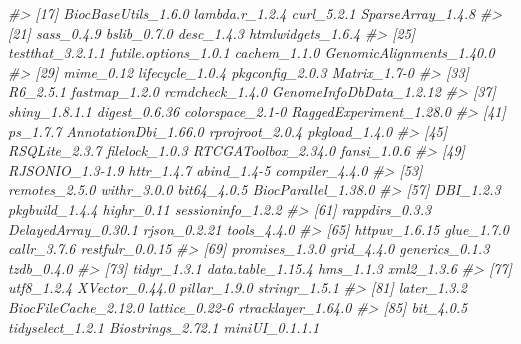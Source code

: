 \documentclass[
]{article}
\newenvironment{Shaded}{\begin{snugshade}}{\end{snugshade}}
\newcommand{\CommentTok}[1]{\textcolor[rgb]{0.56,0.35,0.01}{\textit{#1}}}
\begin{document}
\begin{Shaded}
\begin{Highlighting}[]
\CommentTok{\#\textgreater{}  [17] BiocBaseUtils\_1.6.0       lambda.r\_1.2.4            curl\_5.2.1                SparseArray\_1.4.8        }
\CommentTok{\#\textgreater{}  [21] sass\_0.4.9                bslib\_0.7.0               desc\_1.4.3                htmlwidgets\_1.6.4        }
\CommentTok{\#\textgreater{}  [25] testthat\_3.2.1.1          futile.options\_1.0.1      cachem\_1.1.0              GenomicAlignments\_1.40.0 }
\CommentTok{\#\textgreater{}  [29] mime\_0.12                 lifecycle\_1.0.4           pkgconfig\_2.0.3           Matrix\_1.7{-}0             }
\CommentTok{\#\textgreater{}  [33] R6\_2.5.1                  fastmap\_1.2.0             rcmdcheck\_1.4.0           GenomeInfoDbData\_1.2.12  }
\CommentTok{\#\textgreater{}  [37] shiny\_1.8.1.1             digest\_0.6.36             colorspace\_2.1{-}0          RaggedExperiment\_1.28.0  }
\CommentTok{\#\textgreater{}  [41] ps\_1.7.7                  AnnotationDbi\_1.66.0      rprojroot\_2.0.4           pkgload\_1.4.0            }
\CommentTok{\#\textgreater{}  [45] RSQLite\_2.3.7             filelock\_1.0.3            RTCGAToolbox\_2.34.0       fansi\_1.0.6              }
\CommentTok{\#\textgreater{}  [49] RJSONIO\_1.3{-}1.9           httr\_1.4.7                abind\_1.4{-}5               compiler\_4.4.0           }
\CommentTok{\#\textgreater{}  [53] remotes\_2.5.0             withr\_3.0.0               bit64\_4.0.5               BiocParallel\_1.38.0      }
\CommentTok{\#\textgreater{}  [57] DBI\_1.2.3                 pkgbuild\_1.4.4            highr\_0.11                sessioninfo\_1.2.2        }
\CommentTok{\#\textgreater{}  [61] rappdirs\_0.3.3            DelayedArray\_0.30.1       rjson\_0.2.21              tools\_4.4.0              }
\CommentTok{\#\textgreater{}  [65] httpuv\_1.6.15             glue\_1.7.0                callr\_3.7.6               restfulr\_0.0.15          }
\CommentTok{\#\textgreater{}  [69] promises\_1.3.0            grid\_4.4.0                generics\_0.1.3            tzdb\_0.4.0               }
\CommentTok{\#\textgreater{}  [73] tidyr\_1.3.1               data.table\_1.15.4         hms\_1.1.3                 xml2\_1.3.6               }
\CommentTok{\#\textgreater{}  [77] utf8\_1.2.4                XVector\_0.44.0            pillar\_1.9.0              stringr\_1.5.1            }
\CommentTok{\#\textgreater{}  [81] later\_1.3.2               BiocFileCache\_2.12.0      lattice\_0.22{-}6            rtracklayer\_1.64.0       }
\CommentTok{\#\textgreater{}  [85] bit\_4.0.5                 tidyselect\_1.2.1          Biostrings\_2.72.1         miniUI\_0.1.1.1           }

\end{Highlighting}
\end{Shaded}
\end{document}
